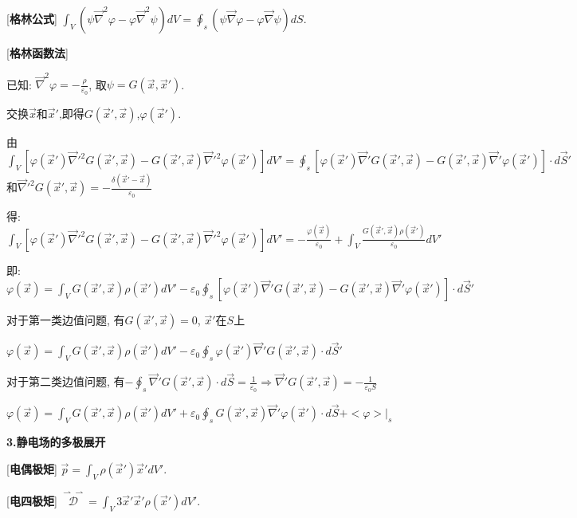 [\textbf{格林公式}] $\int_V(\psi\vec\nabla^2\varphi-\varphi\vec\nabla^2\psi)dV=\oint_s(\psi\vec\nabla\varphi-\varphi\vec\nabla\psi)dS$.\par

[\textbf{格林函数法}]\par
\qquad 已知: $\vec\nabla^2\varphi=-\frac{\rho}{\varepsilon_0}$, 取$\psi=G(\vec x,\vec x')$.\par
\qquad 交换$\vec x$和$\vec x'$,即得$G(\vec x',\vec x)$,$\varphi(\vec x')$.\par
\qquad 由$\int_V\left[\varphi(\vec x')\vec\nabla'^2G(\vec x',\vec x)-G(\vec x',\vec x)\vec\nabla'^2\varphi(\vec x')\right]dV'=\oint_s\left[\varphi(\vec x')\vec\nabla'G(\vec x',\vec x)-G(\vec x',\vec x)\vec\nabla'\varphi(\vec x')\right]\cdot d\vec S'$和$\vec\nabla'^2G(\vec x',\vec x)=-\frac{\delta(\vec x'-\vec x)}{\varepsilon_0}$\par
\qquad \quad 得:$\int_V\left[\varphi(\vec x')\vec\nabla'^2G(\vec x',\vec x)-G(\vec x',\vec x)\vec\nabla'^2\varphi(\vec x')\right]dV'=-\frac{\varphi(\vec x)}{\varepsilon_0}+\int_V\frac{G(\vec x',\vec x)\rho(\vec x')}{\varepsilon_0}dV'$\par
\qquad \quad 即:$\varphi(\vec x)=\int_VG(\vec x',\vec x)\rho(\vec x')dV'-\varepsilon_0\oint_s\left[\varphi(\vec x')\vec\nabla'G(\vec x',\vec x)-G(\vec x',\vec x)\vec\nabla'\varphi(\vec x')\right]\cdot d\vec S'$\par
\qquad 对于第一类边值问题, 有$G(\vec x',\vec x)=0$, $\vec x'$在$S$上\par
\qquad \quad $\varphi(\vec x)=\int_VG(\vec x',\vec x)\rho(\vec x')dV'-\varepsilon_0\oint_s\varphi(\vec x')\vec\nabla'G(\vec x',\vec x)\cdot d\vec S'$\par
\qquad 对于第二类边值问题, 有$-\oint_s\vec\nabla'G(\vec x',\vec x)\cdot d\vec S=\frac{1}{\varepsilon_0}\Rightarrow \vec\nabla'G(\vec x',\vec x)=-\frac{1}{\varepsilon_0S}$\par
\qquad \quad $\varphi(\vec x)=\int_VG(\vec x',\vec x)\rho(\vec x')dV'+\varepsilon_0\oint_sG(\vec x',\vec x)\vec\nabla'\varphi(\vec x')\cdot d\vec S+<\varphi>|_s$

\begin{center}
 \textbf{3.静电场的多极展开}
\end{center}

[\textbf{电偶极矩}] $\vec p=\int_V\rho(\vec x')\vec x'dV'$.\par

[\textbf{电四极矩}] $\overset{\rightharpoonup\!\!\!\! \rightharpoonup}{\mathscr{D}}=\int_V3\vec x'\vec x'\rho(\vec x')dV'$.\par

